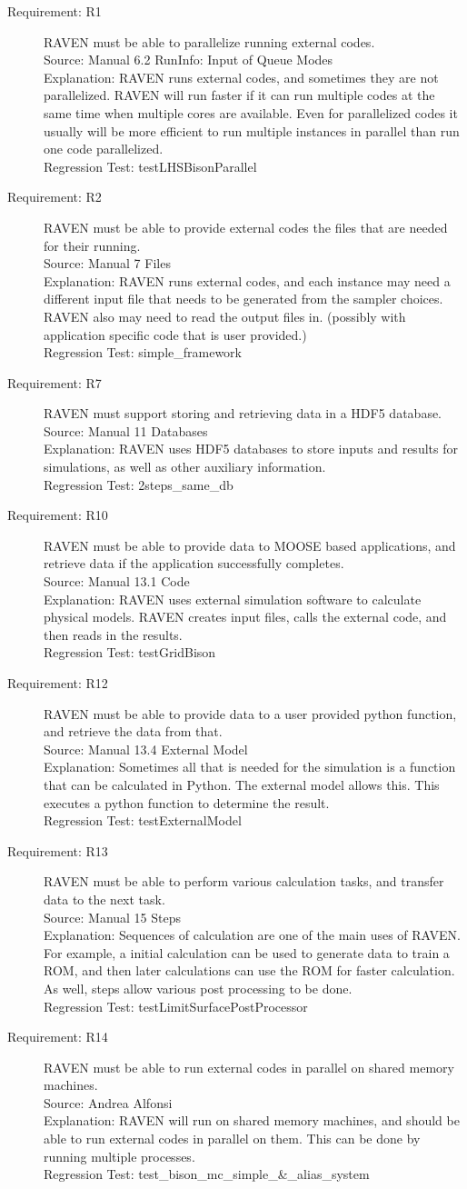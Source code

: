 \documentclass{article}
\newcommand{\requirement}[5]{\item[Requirement: #1] #2 \\Source: #3\\Explanation: #4\\Regression Test: #5}
\begin{document}
\begin{description}
\requirement{R1}{RAVEN must be able to parallelize running external codes.}
{Manual 6.2 RunInfo: Input of Queue Modes}
{RAVEN runs external codes, and sometimes they are not parallelized.  RAVEN will run faster if it can run multiple codes at the same time when multiple cores are available.  Even for parallelized codes it usually will be more efficient to run multiple instances in parallel than run one code parallelized.}
{testLHSBisonParallel}

\requirement{R2}{RAVEN must be able to provide external codes the files that are needed for their running.}
{Manual 7 Files}
{RAVEN runs external codes, and each instance may need a different input file that needs to be generated from the sampler choices.  RAVEN also may need to read the output files in. (possibly with application specific code that is user provided.)}
{simple\_framework}

\requirement{R7}{RAVEN must support storing and retrieving data in a HDF5 database.}
{Manual 11 Databases}
{RAVEN uses HDF5 databases to store inputs and results for simulations, as well as other auxiliary information.}
{2steps\_same\_db}

\requirement{R10}{RAVEN must be able to provide data to MOOSE based applications, and retrieve data if the application successfully completes.}
{Manual 13.1 Code}
{RAVEN uses external simulation software to calculate physical models.  RAVEN creates input files, calls the external code, and then reads in the results.}
{testGridBison}

\requirement{R12}{RAVEN must be able to provide data to a user provided python function, and retrieve the data from that.}
{Manual 13.4 External Model}
{Sometimes all that is needed for the simulation is a function that can be calculated in Python.  The external model allows this.  This executes a python function to determine the result.}
{testExternalModel}

\requirement{R13}{RAVEN must be able to perform various calculation tasks, and transfer data to the next task.}
{Manual 15 Steps}
{Sequences of calculation are one of the main uses of RAVEN.  For example, a initial calculation can be used to generate data to train a ROM, and then later calculations can use the ROM for faster calculation.  As well, steps allow various post processing to be done.}
{testLimitSurfacePostProcessor}
\requirement{R14}{RAVEN must be able to run external codes in parallel on shared memory machines.}
{Andrea Alfonsi}
{RAVEN will run on shared memory machines, and should be able to run external codes in parallel on them.  This can be done by running multiple processes.}
{test\_bison\_mc\_simple\_\&\_alias\_system}


\end{description}
\end{document}

